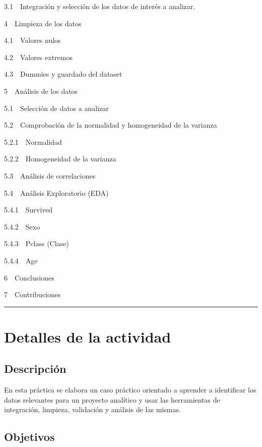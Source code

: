 \documentclass[11pt]{article}
\begin{document}
{{3.1~~}Integración y selección de los datos de interés a analizar.}

{{4~~}Limpieza de los datos}

{{4.1~~}Valores nulos}

{{4.2~~}Valores extremos}

{{4.3~~}Dummies y guardado del dataset}

{{5~~}Análisis de los datos}

{{5.1~~}Selección de datos a analizar}

{{5.2~~}Comprobación de la normalidad y homogeneidad de la varianza}

{{5.2.1~~}Normalidad}

{{5.2.2~~}Homogeneidad de la varianza}

{{5.3~~}Análisis de correlaciones}

{{5.4~~}Análisis Exploratorio (EDA)}

{{5.4.1~~}Survived}

{{5.4.2~~}Sexo}

{{5.4.3~~}Pclass (Clase)}

{{5.4.4~~}Age}

{{6~~}Conclusiones}

{{7~~}Contribuciones}

    \begin{center}\rule{0.5\linewidth}{0.5pt}\end{center}

\hypertarget{detalles-de-la-actividad}{%
\section{Detalles de la actividad}\label{detalles-de-la-actividad}}

\hypertarget{descripciuxf3n}{%
\subsection{Descripción}\label{descripciuxf3n}}

En esta práctica se elabora un caso práctico orientado a aprender a
identificar los datos relevantes para un proyecto analítico y usar las
herramientas de integración, limpieza, validación y análisis de las
mismas.

\hypertarget{objetivos}{%
\subsection{Objetivos}\label{objetivos}}
\end{document}
